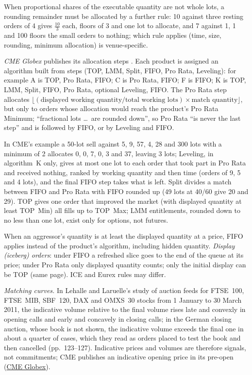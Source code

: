 \begin{qfmechanism}
When proportional shares of the executable quantity are not whole lots, a rounding remainder must be allocated by a further rule: 10 against three resting orders of 4 gives $\tfrac{10}{3}$ each, floors of 3 and one lot to allocate, and 7 against 1, 1 and 100 floors the small orders to nothing; which rule applies (time, size, rounding, minimum allocation) is venue-specific.

\emph{CME Globex} publishes its allocation steps \citep[page ``CME Globex Matching Algorithm Steps'', version~5, 2 June 2026]{cme-wiki-2026}. Each product is assigned an algorithm built from steps (TOP, LMM, Split, FIFO, Pro Rata, Leveling): for example A is TOP, Pro Rata, FIFO; C is Pro Rata, FIFO; F is FIFO; K is TOP, LMM, Split, FIFO, Pro Rata, optional Leveling, FIFO. The Pro Rata step allocates $\lfloor(\text{displayed working quantity}/\text{total working lots})\times\text{match quantity}\rfloor$, but only to orders whose allocation would reach the product's Pro Rata Minimum; ``fractional lots \dots\ are rounded down'', so Pro Rata ``is never the last step'' and is followed by FIFO, or by Leveling and FIFO.

In CME's example a 50-lot sell against 5, 9, 57, 4, 28 and 300 lots with a minimum of 2 allocates 0, 0, 7, 0, 3 and 37, leaving 3 lots; Leveling, in algorithm~K only, gives at most one lot to each order that took part in Pro Rata and received nothing, ranked by working quantity and then time (orders of 9, 5 and 4 lots), and the final FIFO step takes what is left. Split divides a match between FIFO and Pro Rata with FIFO rounded up (49 lots at 40/60 give 20 and 29). TOP gives one order that improved the market (with displayed quantity at least TOP~Min) all fills up to TOP~Max; LMM entitlements, rounded down to no less than one lot, exist only for options, not futures.

When an aggressor's quantity is at least the displayed quantity at a price, FIFO applies instead of the product's algorithm, including hidden quantity. \emph{Display (iceberg) orders}: under FIFO a refreshed slice goes to the end of the queue at its price; under Pro Rata only displayed quantity counts; only the initial display can be TOP (same page). ICE and Eurex rules may differ.

\emph{Matching curves.} In Lehalle and Laruelle's study of auction feeds for FTSE~100, FTSE~MIB, SBF~120, DAX and OMXS~30 stocks from 1 January to 30 March 2011, the indicative volume relative to the final volume rises late and convexly in opening calls and early and concavely in closing calls; in the German closing auction, whose book is not shown, the indicative volume exceeds the final one in about a quarter of cases, which they read as orders placed to test the book and then cancelled (pp.~123--127). Indicative prices and volumes are therefore signals, not commitments; CME publishes an indicative opening price in its pre-open (\hyperref[conv:cme-globex-trading]{CME Globex}).


\end{qfmechanism}
